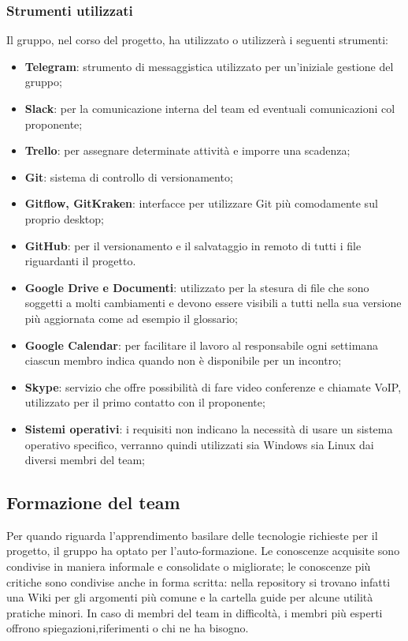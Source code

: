 		\subsubsection{Strumenti utilizzati}
		Il gruppo, nel corso del progetto, ha utilizzato o utilizzerà i seguenti strumenti:
		\begin{itemize}
			\item \textbf{Telegram}: strumento di messaggistica utilizzato per un'iniziale gestione del gruppo;
			\item \textbf{Slack}: per la comunicazione interna del team ed eventuali comunicazioni col proponente;
			\item \textbf{Trello}: per assegnare determinate attività e imporre una scadenza;
			\item \textbf{Git}: sistema di controllo di versionamento;
			\item \textbf{Gitflow, GitKraken}: interfacce per utilizzare Git più comodamente sul proprio desktop;
			\item \textbf{GitHub}: per il versionamento e il salvataggio in remoto di tutti i file riguardanti il progetto.
			\item \textbf{Google Drive e Documenti}: utilizzato per la stesura di file che sono soggetti a molti cambiamenti e devono essere visibili a tutti nella sua versione più aggiornata come ad esempio il glossario;
			\item \textbf{Google Calendar}: per facilitare il lavoro al responsabile ogni settimana ciascun membro indica quando non è disponibile per un incontro;
			\item \textbf{Skype}: servizio che offre possibilità di fare video conferenze e chiamate VoIP, utilizzato per il primo contatto con il proponente;
			\item \textbf{Sistemi operativi}: i requisiti non indicano la necessità di usare un sistema operativo specifico, verranno quindi utilizzati sia Windows sia Linux dai diversi membri del team; %
		\end{itemize}
	\subsection{Formazione del team}
	Per quando riguarda l'apprendimento basilare delle tecnologie richieste per il progetto, il gruppo ha optato per l'auto-formazione. Le conoscenze acquisite sono condivise in maniera informale e consolidate o migliorate; le conoscenze più critiche sono condivise anche in forma scritta: nella repository si trovano infatti una Wiki per gli argomenti più comune e la cartella guide per alcune utilità pratiche minori. In caso di membri del team in difficoltà, i membri più esperti offrono spiegazioni,riferimenti o chi ne ha bisogno.			